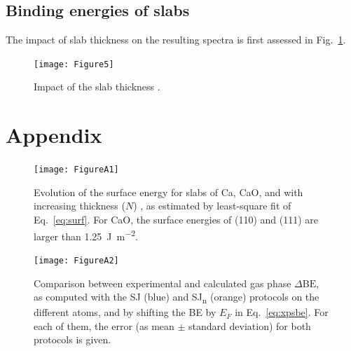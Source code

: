 \documentclass[12pt,a4paper]{article}
\def\dbe{\ensuremath{\Delta\text{BE}}}
\begin{document}
\clearpage
\subsection{Binding energies of slabs}

The impact of slab thickness on the resulting spectra is first assessed in Fig.~\ref{fig:slabsthickness}.


\begin{figure}[!h]
	\centering
	\texttt{[image: Figure5]}
	\caption{Impact of the slab thickness .}
	\label{fig:slabsthickness}
\end{figure}

\clearpage



\clearpage
\appendix
{}
\section{Appendix}
\begin{figure}[!h]
	\texttt{[image: FigureA1]}
	\caption{Evolution of the surface energy for slabs of Ca, CaO, and  with increasing thickness ($N$) , as estimated by least-square fit of Eq.~\eqref{eq:surf}. For CaO, the surface energies of (110) and (111) are larger than \SI{1.25}{\joule\per\meter\squared}.}
	\label{fig:surf}
\end{figure}

\begin{figure}[!h]
	\centering
	\texttt{[image: FigureA2]}
	\caption{Comparison between experimental and calculated gas phase \dbe{}, as computed with the SJ (blue) and SJ\textsubscript{n} (orange) protocols on the different atoms, and by shifting the BE by $E_F$ in Eq.~\eqref{eq:xpsbe}. For each of them, the error (as mean $\pm$ standard deviation) for both protocols is given.}
	\label{fig:xps_C185_fermi}
\end{figure}
	
\end{document}
